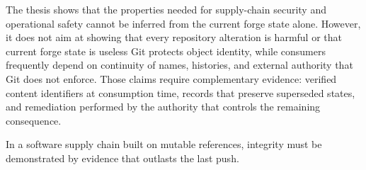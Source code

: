 The thesis shows that the properties needed for supply-chain security and operational safety cannot be inferred from the current forge state alone.
However, it does not aim at showing that every repository alteration is harmful or that current forge state is useless
Git protects object identity, while consumers frequently depend on continuity of names, histories, and external authority that Git does not enforce.
Those claims require complementary evidence: verified content identifiers at consumption time, records that preserve superseded states, and remediation performed by the authority that controls the remaining consequence.

In a software supply chain built on mutable references, integrity must be demonstrated by evidence that outlasts the last push.
